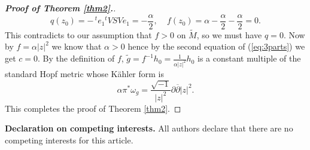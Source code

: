 \documentclass{amsart}
\numberwithin{equation}{section}
\begin{document}
\begin{proof}[{\bf Proof of Theorem \ref{thm2}.}]
$$ q(z_0) = - \,^t\!e_1\mbox{}^t\!V S V e_1 = -\frac{\alpha}{2}, \ \ \ \ \ f(z_0) = \alpha  -\frac{\alpha}{2} -\frac{\alpha}{2} =0. $$
This contradicts to our assumption that $f>0$ on $\widetilde M$, so we must have $q=0$. Now by $f=\alpha |z|^2$ we know  that $\alpha >0$ hence by the second equation of (\ref{eq:3parts}) we get $c=0$. By the definition of $f$, $\widetilde g = f^{-1}h_0 = \frac{1}{\alpha |z|^2} h_0$ is a constant multiple of the standard Hopf metric whose K\"ahler form is
$$ \alpha \pi^{\ast} \omega_g = \frac{\sqrt{-1}}{|z|^2} \partial \overline{\partial} |z|^2. $$
This completes the proof of Theorem \ref{thm2}.
\end{proof}



\vspace{0.3cm}

\noindent\textbf{Declaration on competing interests.}
All authors declare that there are no competing interests for this article.

\vspace{0.3cm}
\end{document}
